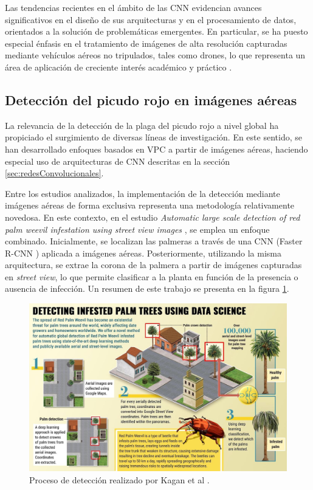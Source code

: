 Las tendencias recientes en el ámbito de las CNN evidencian avances significativos en el diseño de sus arquitecturas y en el procesamiento de datos, orientados a la solución de problemáticas emergentes. En particular, se ha puesto especial énfasis en el tratamiento de imágenes de alta resolución capturadas mediante vehículos aéreos no tripulados, tales como drones, lo que representa un área de aplicación de creciente interés académico y práctico \citep{gao_recent_2024} \citep{sutar_convolutional_2025}.

\subsection{Detección del picudo rojo en imágenes aéreas}

La relevancia de la detección de la plaga del picudo rojo a nivel global ha propiciado el surgimiento de diversas líneas de investigación. En este sentido, se han desarrollado enfoques basados en VPC a partir de imágenes aéreas, haciendo especial uso de arquitecturas de CNN descritas en la sección \ref{sec:redesConvolucionales}.

Entre los estudios analizados, la implementación de la detección mediante imágenes aéreas de forma exclusiva representa una metodología relativamente novedosa. En este contexto, en el estudio \textit{Automatic large scale detection of red palm weevil infestation using street view images} \citep{kagan_automatic_2021}, se emplea un enfoque combinado. Inicialmente, se localizan las palmeras a través de una CNN (Faster R-CNN \citep{ren_faster_2016}) aplicada a imágenes aéreas. Posteriormente, utilizando la misma arquitectura, se extrae la corona de la palmera a partir de imágenes capturadas en \textit{street view}, lo que permite clasificar a la planta en función de la presencia o ausencia de infección. Un resumen de este trabajo se presenta en la figura \ref{fig:kagan-automatic-2021-process}.

\begin{figure}[htpb]
  \centering
  \includegraphics[scale=1.8]{./Figures/kagan_automatic_2021-process.jpg}
  \caption{Proceso de detección realizado por Kagan et al \protect\footnotemark.}
  \label{fig:kagan-automatic-2021-process}
\end{figure}

